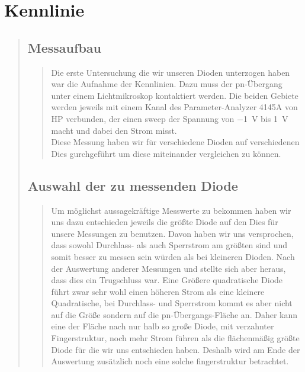 \section{Kennlinie}
\begin{quote}
    \subsection{Messaufbau}
    \begin{quote}
        Die erste Untersuchung die wir unseren Dioden unterzogen haben war die Aufnahme der Kennlinien. Dazu muss der
        pn-Übergang unter einem Lichtmikroskop kontaktiert werden. Die beiden Gebiete werden jeweils mit einem Kanal des
        Parameter-Analyzer 4145A von HP verbunden, der einen sweep der Spannung von \SI{-1}{\volt} bis \SI{1}{\volt} macht
        und dabei den Strom misst.\\
        Diese Messung haben wir für verschiedene Dioden auf verschiedenen Dies gurchgeführt um diese miteinander vergleichen
        zu können.
    \end{quote} %
    
    
    \subsection{Auswahl der zu messenden Diode}
    \begin{quote}
        Um möglichst aussagekräftige Messwerte zu bekommen haben wir uns dazu entschieden jeweils die größte Diode auf
        den Dies für unsere Messungen zu benutzen. Davon haben wir uns versprochen, dass sowohl Durchlass- als
        auch Sperrstrom am größten sind und somit besser zu messen sein würden als bei kleineren Dioden.
        Nach der Auswertung anderer Messungen und  stellte sich aber heraus, dass
        dies ein Trugschluss war. Eine Größere quadratische Diode führt zwar sehr wohl einen höheren Strom als eine
        kleinere Quadratische, bei Durchlass- und Sperrstrom kommt es aber nicht auf die Größe sondern auf die
        pn-Übergangs-Fläche an. Daher kann eine der Fläche nach nur halb so große Diode, mit verzahnter Fingerstruktur,
        noch mehr Strom führen als die flächenmäßig größte Diode für die wir uns entschieden haben. Deshalb wird am Ende
        der Auswertung zusätzlich noch eine solche fingerstruktur betrachtet.
        
     \end{quote} %
    

\end{quote}
